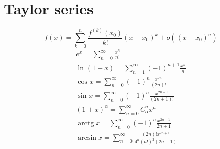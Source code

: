 \DeclareMathOperator{\arctg}{arctg}
\section{Taylor series}
\[f(x) = \sum_{k=0}^n \frac{f^{(k)}(x_0)}{k!} (x-x_0)^k + o((x-x_0)^n)\]
\begin{align*}
	e^x = \sum_{n = 0}^\infty \frac{x^n}{n!} \\
	\ln (1 + x) = \sum_{n = 1}^\infty (-1)^{n + 1} \frac{x^n}{n} \\
	\cos x = \sum_{n=0}^\infty (-1)^n \frac{x^{2n}}{(2n)!} \\
	\sin x = \sum_{n=0}^\infty (-1)^n \frac{x^{2n + 1}}{(2n + 1)!} \\
	(1 + x)^\alpha = \sum_{n=0}^\infty C_\alpha^n x^n \\
	\arctg x = \sum_{n=0}^\infty (-1)^n \frac{x^{2n + 1}}{2n + 1} \\
	\arcsin x = \sum_{n=0}^\infty \frac{(2n)! x^{2n + 1}}{4^n (n!)^2 (2n + 1)}
\end{align*}
